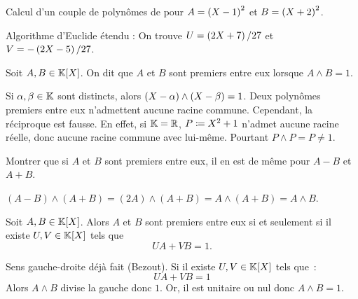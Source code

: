 \documentclass{magnolia}
\begin{document}
\begin{exoUnique}
\exo Calcul d'un couple de polynômes de  pour $A=\left(X-1\right)^2$ et
  $B=\left(X+2\right)^2$.
  \begin{sol}
  Algorithme d'Euclide étendu :
   On trouve $U=\left(2X+7\right)/27$ et $V=-\left(2X-5\right)/27$.    
  \end{sol}
\end{exoUnique}

\begin{definition}
Soit $A,B\in\polyK$. On dit que $A$ et $B$ sont premiers entre eux lorsque
$A\wedge B=1$.
\end{definition}

\begin{remarques}
\remarque Si $\alpha,\beta\in\mathbb{K}$ sont distincts, alors
  $\left(X-\alpha\right)\wedge\left(X-\beta\right)=1$.
\remarque Deux polynômes premiers entre eux n'admettent aucune racine commune.
  Cependant, la réciproque est fausse. En effet, si $\mathbb{K}=\mathbb{R}$, $P\coloneqq X^2+1$ n'admet
  aucune racine réelle, donc aucune racine commune avec lui-même.
  Pourtant $P\wedge P=P\neq 1$.
\end{remarques}

\begin{exoUnique}
\exo Montrer que si $A$ et $B$ sont premiers entre eux, il en est de même
  pour $A-B$ et $A+B$.
  \begin{sol}
  $(A-B)\wedge (A+B)=(2A)\wedge (A+B)=A\wedge (A+B)=A\wedge B$.
  \end{sol}
\end{exoUnique}

\begin{proposition}
Soit $A,B\in\polyK$. Alors $A$ et $B$ sont premiers entre eux si et seulement
si il existe $U,V\in\polyK$ tels que
\[UA+VB=1.\]
\end{proposition}

\begin{preuve}
Sens gauche-droite déjà fait (Bezout).
Si il existe $U,V\in\polyK$ tels que~:
\[UA+VB=1\]
Alors $A\wedge B$ divise la gauche donc $1$. Or, il est unitaire ou nul donc $A\wedge B=1$.
\end{preuve}
\end{document}
